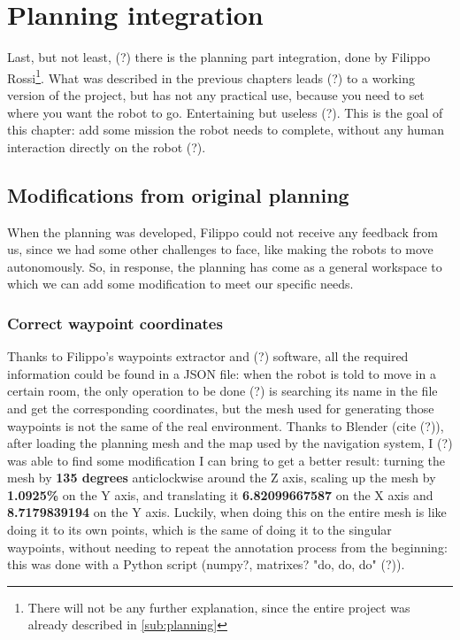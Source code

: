 \chapter{Planning integration}

Last, but not least, (?) there is the planning part integration, done by Filippo Rossi\footnote{There will not be any further explanation, since the entire project was already described in \autoref{sub:planning}}. What was described in the previous chapters leads (?) to a working version of the project, but has not any practical use, because you need to set where you want the robot to go. Entertaining but useless (?). This is the goal of this chapter: add some mission the robot needs to complete, without any human interaction directly on the robot (?).

\section{Modifications from original planning}

When the planning was developed, Filippo could not receive any feedback from us, since we had some other challenges to face, like making the robots to move autonomously. So, in response, the planning has come as a general workspace to which we can add some modification to meet our specific needs.

\subsection{Correct waypoint coordinates}

Thanks to Filippo's waypoints extractor and  (?) software, all the required information could be found in a JSON file: when the robot is told to move in a certain room, the only operation to be done (?) is searching its name in the file and get the corresponding coordinates, but the mesh used for generating those waypoints is not the same of the real environment.
Thanks to Blender (cite (?)), after loading the planning mesh and the map used by the navigation system, I (?) was able to find some modification I can bring to get a better result: turning the mesh by {\bf 135 degrees} anticlockwise around the Z axis, scaling up the mesh by {\bf 1.0925\%} on the Y axis, and translating it {\bf 6.82099667587} on the X axis and {\bf 8.7179839194} on the Y axis. Luckily, when doing this on the entire mesh is like doing it to its own points, which is the same of doing it to the singular waypoints, without needing to repeat the annotation process from the beginning: this was done with a Python script (numpy?, matrixes? "do, do, do" (?)).


